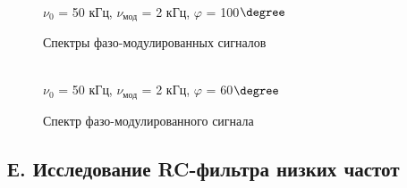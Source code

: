 \documentclass[a4paper,12pt]{article}
\begin{document}
\begin{enumerate}
\begin{figure}[h]
\begin{minipage}[h]{0.44\linewidth}
\end{minipage}
\hfill
\begin{minipage}[h]{0.44\linewidth}
 \\ $\nu_0$ = 50 кГц, $\nu_\text{мод}$ = 2 кГц, $\varphi$ = 100$ \degree$
\end{minipage}
\vfill
\caption{Спектры фазо-модулированных сигналов}
\label{ris:experimentalcorrelationsignals6}
\end{figure}

\newpage

\begin{figure}[h]
\begin{minipage}[h]{0.44\linewidth}
 \\ $\nu_0$ = 50 кГц, $\nu_\text{мод}$ = 2 кГц, $\varphi$ = 60$ \degree$
\end{minipage}
\caption{Спектр фазо-модулированного сигнала}
\label{ris:experimentalcorrelationsignals7}
\end{figure}
\end{enumerate}

\subsection*{Е. Исследование RC-фильтра низких частот}
\end{document}
